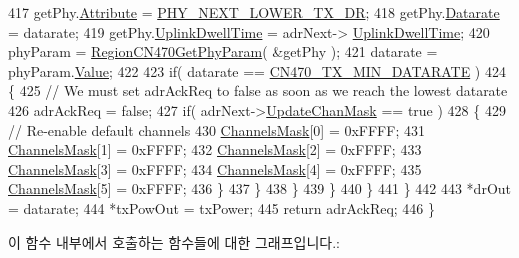 \begin{DoxyCode}
417                     getPhy.\mbox{\hyperlink{structs_get_phy_params_abdcb168ffd6913b85e2f635d7a475f2d}{Attribute}} = \mbox{\hyperlink{group___r_e_g_i_o_n_gga51cbe8f5433d914fe9cf81b451de2c2dac002e7e492cf30dbf9c544b062f5cc8a}{PHY\_NEXT\_LOWER\_TX\_DR}};
418                     getPhy.\mbox{\hyperlink{structs_get_phy_params_ae2f6080f3aa0e9485c55513ca56bb24d}{Datarate}} = datarate;
419                     getPhy.\mbox{\hyperlink{structs_get_phy_params_a0e6663762d6f9173bc8d8cb018f8f17a}{UplinkDwellTime}} = adrNext->
      \mbox{\hyperlink{structs_adr_next_params_a0e6663762d6f9173bc8d8cb018f8f17a}{UplinkDwellTime}};
420                     phyParam = \mbox{\hyperlink{group___r_e_g_i_o_n_c_n470_gaa3f4e59184226b161b9e6880b6e7f204}{RegionCN470GetPhyParam}}( &getPhy );
421                     datarate = phyParam.\mbox{\hyperlink{unionu_phy_param_a8e0dcce3428a8051614e852b8836d0d1}{Value}};
422 
423                     \textcolor{keywordflow}{if}( datarate == \mbox{\hyperlink{group___r_e_g_i_o_n_c_n470_gafc089f5bdc4ad69267f562d1fda11f79}{CN470\_TX\_MIN\_DATARATE}} )
424                     \{
425                         \textcolor{comment}{// We must set adrAckReq to false as soon as we reach the lowest datarate}
426                         adrAckReq = \textcolor{keyword}{false};
427                         \textcolor{keywordflow}{if}( adrNext->\mbox{\hyperlink{structs_adr_next_params_a708080da9c63d868556b2c48cb53003b}{UpdateChanMask}} == \textcolor{keyword}{true} )
428                         \{
429                             \textcolor{comment}{// Re-enable default channels}
430                             \mbox{\hyperlink{_region_c_n470_8c_a2188957b5ca6af8092154d7ccbfa5757}{ChannelsMask}}[0] = 0xFFFF;
431                             \mbox{\hyperlink{_region_c_n470_8c_a2188957b5ca6af8092154d7ccbfa5757}{ChannelsMask}}[1] = 0xFFFF;
432                             \mbox{\hyperlink{_region_c_n470_8c_a2188957b5ca6af8092154d7ccbfa5757}{ChannelsMask}}[2] = 0xFFFF;
433                             \mbox{\hyperlink{_region_c_n470_8c_a2188957b5ca6af8092154d7ccbfa5757}{ChannelsMask}}[3] = 0xFFFF;
434                             \mbox{\hyperlink{_region_c_n470_8c_a2188957b5ca6af8092154d7ccbfa5757}{ChannelsMask}}[4] = 0xFFFF;
435                             \mbox{\hyperlink{_region_c_n470_8c_a2188957b5ca6af8092154d7ccbfa5757}{ChannelsMask}}[5] = 0xFFFF;
436                         \}
437                     \}
438                 \}
439             \}
440         \}
441     \}
442 
443     *drOut = datarate;
444     *txPowOut = txPower;
445     \textcolor{keywordflow}{return} adrAckReq;
446 \}
\end{DoxyCode}
이 함수 내부에서 호출하는 함수들에 대한 그래프입니다.\+:
\mbox{\label{group___r_e_g_i_o_n_c_n470_gaed1dc3304fd0c26cbd5ff5d6177954d5}} 
